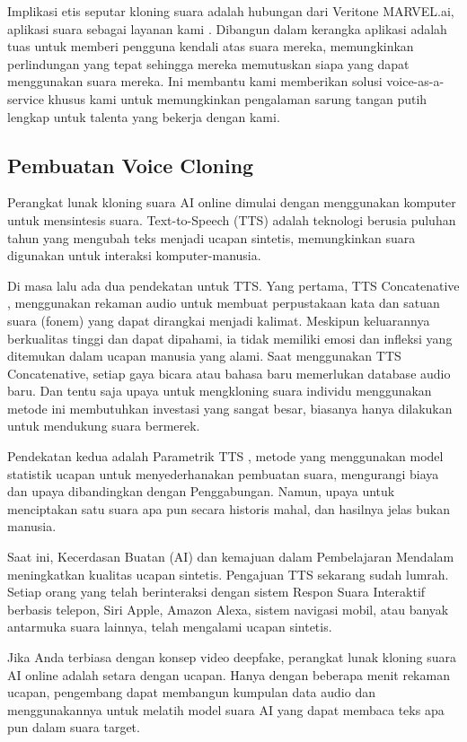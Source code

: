 Implikasi etis seputar kloning suara adalah hubungan dari Veritone MARVEL.ai, aplikasi suara sebagai layanan kami . Dibangun dalam kerangka aplikasi adalah tuas untuk memberi pengguna kendali atas suara mereka, memungkinkan perlindungan yang tepat sehingga mereka memutuskan siapa yang dapat menggunakan suara mereka. Ini membantu kami memberikan solusi voice-as-a-service khusus kami untuk memungkinkan pengalaman sarung tangan putih lengkap untuk talenta yang bekerja dengan kami.

\subsection{Pembuatan Voice Cloning}
Perangkat lunak kloning suara AI online dimulai dengan menggunakan komputer untuk mensintesis suara. Text-to-Speech (TTS) adalah teknologi berusia puluhan tahun yang mengubah teks menjadi ucapan sintetis, memungkinkan suara digunakan untuk interaksi komputer-manusia.

Di masa lalu ada dua pendekatan untuk TTS. Yang pertama, TTS Concatenative , menggunakan rekaman audio untuk membuat perpustakaan kata dan satuan suara (fonem) yang dapat dirangkai menjadi kalimat. Meskipun keluarannya berkualitas tinggi dan dapat dipahami, ia tidak memiliki emosi dan infleksi yang ditemukan dalam ucapan manusia yang alami. Saat menggunakan TTS Concatenative, setiap gaya bicara atau bahasa baru memerlukan database audio baru. Dan tentu saja upaya untuk mengkloning suara individu menggunakan metode ini membutuhkan investasi yang sangat besar, biasanya hanya dilakukan untuk mendukung suara bermerek.

Pendekatan kedua adalah Parametrik TTS , metode yang menggunakan model statistik ucapan untuk menyederhanakan pembuatan suara, mengurangi biaya dan upaya dibandingkan dengan Penggabungan. Namun, upaya untuk menciptakan satu suara apa pun secara historis mahal, dan hasilnya jelas bukan manusia.

Saat ini, Kecerdasan Buatan (AI) dan kemajuan dalam Pembelajaran Mendalam meningkatkan kualitas ucapan sintetis. Pengajuan TTS sekarang sudah lumrah. Setiap orang yang telah berinteraksi dengan sistem Respon Suara Interaktif berbasis telepon, Siri Apple, Amazon Alexa, sistem navigasi mobil, atau banyak antarmuka suara lainnya, telah mengalami ucapan sintetis.

Jika Anda terbiasa dengan konsep video deepfake, perangkat lunak kloning suara AI online adalah setara dengan ucapan. Hanya dengan beberapa menit rekaman ucapan, pengembang dapat membangun kumpulan data audio dan menggunakannya untuk melatih model suara AI yang dapat membaca teks apa pun dalam suara target.

